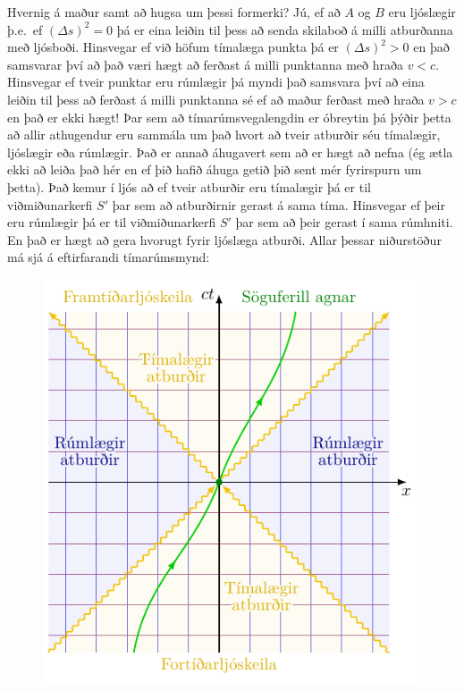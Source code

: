 Hvernig á maður samt að hugsa um þessi formerki? Jú, ef að $A$ og $B$ eru ljóslægir þ.e.~ef $(\Delta s)^2 = 0$ þá er eina leiðin til þess að senda skilaboð á milli atburðanna með ljósboði. Hinsvegar ef við höfum tímalæga punkta þá er $(\Delta s)^2 > 0$ en það samsvarar því að það væri hægt að ferðast á milli punktanna með hraða $v < c$. Hinsvegar ef tveir punktar eru rúmlægir þá myndi það samsvara því að eina leiðin til þess að ferðast á milli punktanna sé ef að maður ferðast með hraða $v > c$ en það er ekki hægt! Þar sem að tímarúmsvegalengdin er óbreytin þá þýðir þetta að allir athugendur eru sammála um það hvort að tveir atburðir séu tímalægir, ljóslægir eða rúmlægir. Það er annað áhugavert sem að er hægt að nefna (ég ætla ekki að leiða það hér en ef þið hafið áhuga getið þið sent mér fyrirspurn um þetta). Það kemur í ljós að ef tveir atburðir eru tímalægir þá er til viðmiðunarkerfi $S'$ þar sem að atburðirnir gerast á sama tíma. Hinsvegar ef þeir eru rúmlægir þá er til viðmiðunarkerfi $S'$ þar sem að þeir gerast í sama rúmhniti. En það er hægt að gera hvorugt fyrir ljóslæga atburði. Allar þessar niðurstöður má sjá á eftirfarandi tímarúmsmynd:
\begin{figure}[H]
    \centering
    \includegraphics[scale = 0.8]{figures/spacetime6.pdf}
\end{figure}



